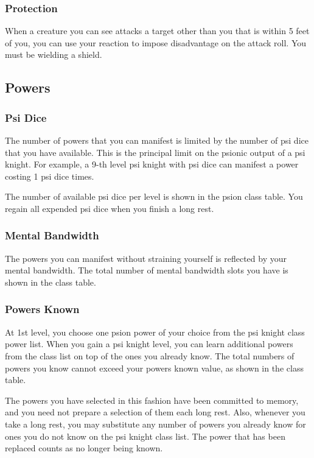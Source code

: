 \subsubsection{Protection}
When a creature you can see attacks a target other than you
that is within 5 feet of you,
you can use your reaction to impose disadvantage on the attack roll.
You must be wielding a shield.

\subsection{Powers}
\subsubsection{Psi Dice}
The number of powers that you can manifest
is limited by the number of psi dice that
you have available.
This is the principal limit on the psionic output of a psi knight.
For example, a 9-th level psi knight with {\pklvlnine} psi dice
can manifest a power costing 1 psi dice {\pklvlnine} times.

The number of available psi dice per level
is shown in the psion class table.
You regain all expended psi dice when you finish
a long rest.

\subsubsection{Mental Bandwidth}
The powers you can manifest without straining yourself
is reflected by your mental bandwidth.
The total number of mental bandwidth slots you have
is shown in the class table.

\subsubsection{Powers Known}
At 1st level,
you choose one psion power of your choice
from the psi knight class power list.
When you gain a psi knight level,
you can learn additional powers from the class list
on top of the ones you already know.
The total numbers of powers you know cannot
exceed your powers known value,
as shown in the class table.

The powers you have selected in this fashion have been committed
to memory, and you need not prepare a selection of them each long rest.
Also,
whenever you take a long rest,
you may substitute any number of powers you already know
for ones you do not know on the psi knight class list.
The power that has been replaced counts as no longer being known.

